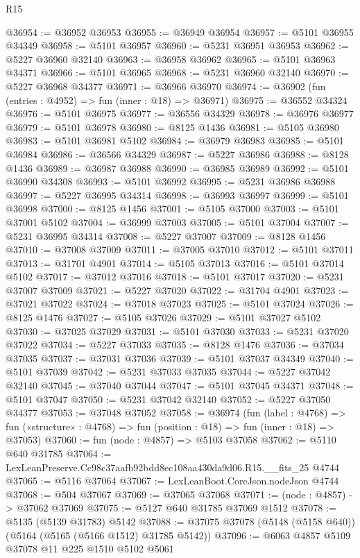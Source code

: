 \begin{lexlean}{R15}
\begin{coremodule}
{{{{{{{{{{{@36954 := @36952 @36953
@36955 := @36949 @36954
@36957 := @5101 @36955 @34349
@36958 := @5101 @36957
@36960 := @5231 @36951 @36953
@36962 := @5227 @36960 @32140
@36963 := @36958 @36962
@36965 := @5101 @36963 @34371
@36966 := @5101 @36965
@36968 := @5231 @36960 @32140
@36970 := @5227 @36968 @34377
@36971 := @36966 @36970
@36974 := @36902 (fun (entries : @4952) => fun (inner : @18) => @36971)
@36975 := @36552 @34324
@36976 := @5101 @36975
@36977 := @36556 @34329
@36978 := @36976 @36977
@36979 := @5101 @36978
@36980 := @8125 @1436
@36981 := @5105 @36980
@36983 := @5101 @36981 @5102
@36984 := @36979 @36983
@36985 := @5101 @36984
@36986 := @36566 @34329
@36987 := @5227 @36986
@36988 := @8128 @1436
@36989 := @36987 @36988
@36990 := @36985 @36989
@36992 := @5101 @36990 @34308
@36993 := @5101 @36992
@36995 := @5231 @36986 @36988
@36997 := @5227 @36995 @34314
@36998 := @36993 @36997
@36999 := @5101 @36998
@37000 := @8125 @1456
@37001 := @5105 @37000
@37003 := @5101 @37001 @5102
@37004 := @36999 @37003
@37005 := @5101 @37004
@37007 := @5231 @36995 @34314
@37008 := @5227 @37007
@37009 := @8128 @1456
@37010 := @37008 @37009
@37011 := @37005 @37010
@37012 := @5101 @37011
@37013 := @31701 @4901
@37014 := @5105 @37013
@37016 := @5101 @37014 @5102
@37017 := @37012 @37016
@37018 := @5101 @37017
@37020 := @5231 @37007 @37009
@37021 := @5227 @37020
@37022 := @31704 @4901
@37023 := @37021 @37022
@37024 := @37018 @37023
@37025 := @5101 @37024
@37026 := @8125 @1476
@37027 := @5105 @37026
@37029 := @5101 @37027 @5102
@37030 := @37025 @37029
@37031 := @5101 @37030
@37033 := @5231 @37020 @37022
@37034 := @5227 @37033
@37035 := @8128 @1476
@37036 := @37034 @37035
@37037 := @37031 @37036
@37039 := @5101 @37037 @34349
@37040 := @5101 @37039
@37042 := @5231 @37033 @37035
@37044 := @5227 @37042 @32140
@37045 := @37040 @37044
@37047 := @5101 @37045 @34371
@37048 := @5101 @37047
@37050 := @5231 @37042 @32140
@37052 := @5227 @37050 @34377
@37053 := @37048 @37052
@37058 := @36974
    (fun (label : @4768) =>
    fun («structure» : @4768) => fun (position : @18) => fun (inner : @18) => @37053)
@37060 := fun (node : @4857) => @5103 @37058
@37062 := @5110 @640 @31785
@37064 := LexLeanPreserve.Cc98c37aafb92bdd8ec108aa430da9d06.R15.__fits_25 @4744
@37065 := @5116 @37064
@37067 := LexLeanBoot.CoreJson.nodeJson @4744
@37068 := @504 @37067
@37069 := @37065 @37068
@37071 := (node : @4857) -> @37062 @37069
@37075 := @5127 @640 @31785 @37069 @1512
@37078 := @5135 (@5139 @31783) @5142
@37088 := @37075 @37078 (@5148 (@5158 @640)) (@5164 (@5165 (@5166 @1512) @31785 @5142))
@37096 := @6063 @4857 @5109 @37078 @11 @225 @1510 @5102 @5061
}}}}}}}}}}}
\end{coremodule}
\end{lexlean}

